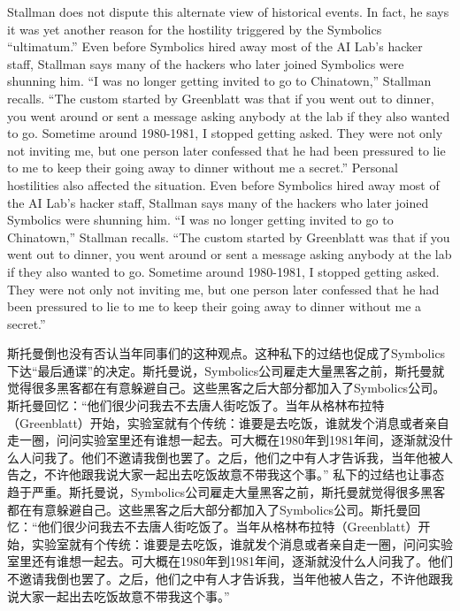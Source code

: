 \ifdefined\eng
\ifdefined\vone
Stallman does not dispute this alternate view of historical events. In fact, he says it was yet another reason for the hostility triggered by the Symbolics ``ultimatum.'' Even before Symbolics hired away most of the AI Lab's hacker staff, Stallman says many of the hackers who later joined Symbolics were shunning him. ``I was no longer getting invited to go to Chinatown,'' Stallman recalls. ``The custom started by Greenblatt was that if you went out to dinner, you went around or sent a message asking anybody at the lab if they also wanted to go. Sometime around 1980-1981, I stopped getting asked. They were not only not inviting me, but one person later confessed that he had been pressured to lie to me to keep their going away to dinner without me a secret.''
\fi
\ifdefined\vtwo
Personal hostilities also affected the situation.   Even before Symbolics hired away most of the AI Lab's hacker staff, Stallman says many of the hackers who later joined Symbolics were shunning him. ``I was no longer getting invited to go to Chinatown,'' Stallman recalls. ``The custom started by Greenblatt was that if you went out to dinner, you went around or sent a message asking anybody at the lab if they also wanted to go. Sometime around 1980-1981, I stopped getting asked. They were not only not inviting me, but one person later confessed that he had been pressured to lie to me to keep their going away to dinner without me a secret.''
\fi
\fi

\ifdefined\chs
\ifdefined\vone
斯托曼倒也没有否认当年同事们的这种观点。这种私下的过结也促成了Symbolics下达``最后通谍''的决定。斯托曼说，Symbolics公司雇走大量黑客之前，斯托曼就觉得很多黑客都在有意躲避自己。这些黑客之后大部分都加入了Symbolics公司。斯托曼回忆：``他们很少问我去不去唐人街吃饭了。当年从格林布拉特（Greenblatt）开始，实验室就有个传统：谁要是去吃饭，谁就发个消息或者亲自走一圈，问问实验室里还有谁想一起去。可大概在1980年到1981年间，逐渐就没什么人问我了。他们不邀请我倒也罢了。之后，他们之中有人才告诉我，当年他被人告之，不许他跟我说大家一起出去吃饭故意不带我这个事。''
\fi
\ifdefined\vtwo
私下的过结也让事态趋于严重。斯托曼说，Symbolics公司雇走大量黑客之前，斯托曼就觉得很多黑客都在有意躲避自己。这些黑客之后大部分都加入了Symbolics公司。斯托曼回忆：``他们很少问我去不去唐人街吃饭了。当年从格林布拉特（Greenblatt）开始，实验室就有个传统：谁要是去吃饭，谁就发个消息或者亲自走一圈，问问实验室里还有谁想一起去。可大概在1980年到1981年间，逐渐就没什么人问我了。他们不邀请我倒也罢了。之后，他们之中有人才告诉我，当年他被人告之，不许他跟我说大家一起出去吃饭故意不带我这个事。''
\fi
\fi

